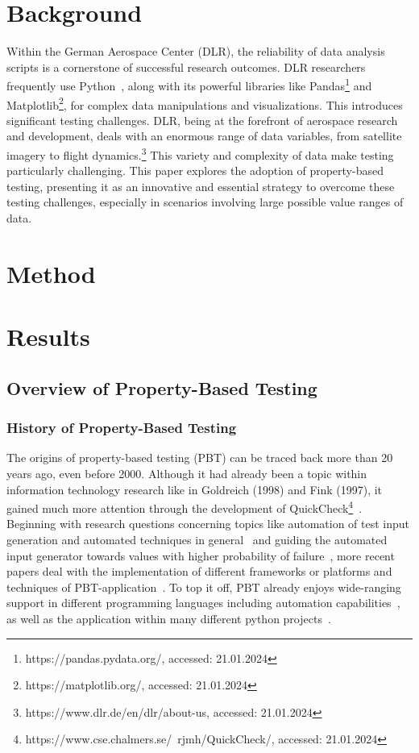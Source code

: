 \documentclass[runningheads]{llncs}
\begin{document}
\section{Background}
Within the German Aerospace Center (DLR), the reliability of data analysis scripts is a cornerstone of successful research outcomes. DLR researchers frequently use Python~\cite{Kurnatowski2020}, along with its powerful libraries like Pandas\footnote{https://pandas.pydata.org/, accessed: 21.01.2024} and Matplotlib\footnote{https://matplotlib.org/, accessed: 21.01.2024}, for complex data manipulations and visualizations. This introduces significant testing challenges. DLR, being at the forefront of aerospace research and development, deals with an enormous range of data variables, from satellite imagery to flight dynamics.\footnote{https://www.dlr.de/en/dlr/about-us, accessed: 21.01.2024} This variety and complexity of data make testing particularly challenging. This paper explores the adoption of property-based testing, presenting it as an innovative and essential strategy to overcome these testing challenges, especially in scenarios involving large possible value ranges of data.

\section{Method}

\section{Results}
\subsection{Overview of Property-Based Testing}
\subsubsection{History of Property-Based Testing}
The origins of property-based testing (PBT) can be traced back more than 20 years ago, even before 2000. Although it had already been a topic within information technology research like in Goldreich (1998) and Fink (1997), it gained much more attention through the development of QuickCheck\footnote{https://www.cse.chalmers.se/~rjmh/QuickCheck/, accessed: 21.01.2024}~\cite{Shi2023,Fink1997,MacIver2019,Honarvar2020}. Beginning with research questions concerning topics like automation of test input generation and automated techniques in general~\cite{Fink1997} and guiding the automated input generator towards values with higher probability of failure~\cite{Loescher2017}, more recent papers deal with the implementation of different frameworks or platforms and techniques of PBT-application~\cite{Padhye2019,Honarvar2020,Shi2023,Corgozinho2023}. To top it off, PBT already enjoys wide-ranging support in different programming languages including automation capabilities~\cite{Chen2022,Padhye2019,Honarvar2020,ElazarMittelman2023,Shi2023}, as well as the application within many different python projects~\cite{Corgozinho2023}.
\end{document}
